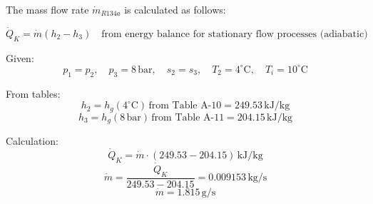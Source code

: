 The mass flow rate \( \dot{m}_{R134a} \) is calculated as follows:  

\[
\dot{Q}_K = \dot{m} (h_2 - h_3) \quad \text{from energy balance for stationary flow processes (adiabatic)}  
\]

Given:  
\[
p_1 = p_2, \quad p_3 = 8 \, \text{bar}, \quad s_2 = s_3, \quad T_2 = 4^\circ \text{C}, \quad T_i = 10^\circ \text{C}  
\]

From tables:  
\[
h_2 = h_g (4^\circ \text{C}) \, \text{from Table A-10} = 249.53 \, \text{kJ/kg}  
\]
\[
h_3 = h_g (8 \, \text{bar}) \, \text{from Table A-11} = 204.15 \, \text{kJ/kg}  
\]

Calculation:  
\[
\dot{Q}_K = \dot{m} \cdot (249.53 - 204.15) \, \text{kJ/kg}  
\]
\[
\dot{m} = \frac{\dot{Q}_K}{249.53 - 204.15} = 0.009153 \, \text{kg/s}  
\]
\[
\dot{m} = 1.815 \, \text{g/s}  
\]